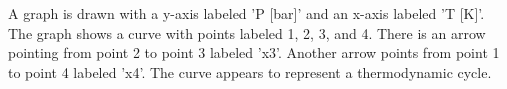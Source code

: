 A graph is drawn with a y-axis labeled 'P [bar]' and an x-axis labeled 'T [K]'. The graph shows a curve with points labeled 1, 2, 3, and 4. There is an arrow pointing from point 2 to point 3 labeled 'x3'. Another arrow points from point 1 to point 4 labeled 'x4'. The curve appears to represent a thermodynamic cycle.